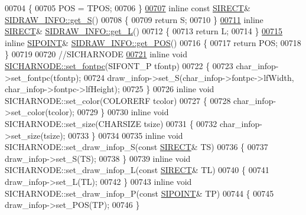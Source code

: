 \begin{DoxyCode}
00704 \{
00705     POS = TPOS;
00706 \}
\hyperlink{class_s_i_d_r_a_w___i_n_f_o_abb39527ef4c718afe5c78692fc24f12c}{00707} \textcolor{keyword}{inline} \textcolor{keyword}{const} \hyperlink{struct_s_i_r_e_c_t}{SIRECT}& \hyperlink{class_s_i_d_r_a_w___i_n_f_o_abb39527ef4c718afe5c78692fc24f12c}{SIDRAW\_INFO::get\_S}()
00708 \{
00709     \textcolor{keywordflow}{return} S;
00710 \}
\hyperlink{class_s_i_d_r_a_w___i_n_f_o_abb4f53a14df75b907572d7d95c275b1d}{00711} \textcolor{keyword}{inline} \hyperlink{struct_s_i_r_e_c_t}{SIRECT}& \hyperlink{class_s_i_d_r_a_w___i_n_f_o_abb4f53a14df75b907572d7d95c275b1d}{SIDRAW\_INFO::get\_L}()
00712 \{
00713     \textcolor{keywordflow}{return} L;
00714 \}
\hyperlink{class_s_i_d_r_a_w___i_n_f_o_aeca1707cc1e7e849f7e4e14f8ea36503}{00715} \textcolor{keyword}{inline} \hyperlink{struct_s_i_p_o_i_n_t}{SIPOINT}& \hyperlink{class_s_i_d_r_a_w___i_n_f_o_aeca1707cc1e7e849f7e4e14f8ea36503}{SIDRAW\_INFO::get\_POS}()
00716 \{
00717     \textcolor{keywordflow}{return} POS;
00718 \}
00719 
00720 \textcolor{comment}{//SICHARNODE}
\hyperlink{class_s_i_c_h_a_r_n_o_d_e_aad179bc8f8fc9a4789e0b9ba06ecef9a}{00721} \textcolor{keyword}{inline} \textcolor{keywordtype}{void} \hyperlink{class_s_i_c_h_a_r_n_o_d_e_aad179bc8f8fc9a4789e0b9ba06ecef9a}{SICHARNODE::set\_fontpc}(SIFONT\_P tfontp)
00722 \{
00723     char\_infop->set\_fontpc(tfontp);
00724     draw\_infop->set\_S(char\_infop->fontpc->lfWidth, char\_infop->fontpc->lfHeight);
00725 \}
00726 \textcolor{keyword}{inline} \textcolor{keywordtype}{void} SICHARNODE::set\_color(COLORERF tcolor)
00727 \{
00728     char\_infop->set\_color(tcolor);
00729 \}
00730 \textcolor{keyword}{inline} \textcolor{keywordtype}{void} SICHARNODE::set\_size(CHARSIZE tsize)
00731 \{
00732     char\_infop->set\_size(tsize);
00733 \}
00734 
00735 \textcolor{keyword}{inline} \textcolor{keywordtype}{void} SICHARNODE::set\_draw\_infop\_S(\textcolor{keyword}{const} \hyperlink{struct_s_i_r_e_c_t}{SIRECT}& TS)
00736 \{
00737     draw\_infop->set\_S(TS);
00738 \}
00739 \textcolor{keyword}{inline} \textcolor{keywordtype}{void} SICHARNODE::set\_draw\_infop\_L(\textcolor{keyword}{const} \hyperlink{struct_s_i_r_e_c_t}{SIRECT}& TL)
00740 \{
00741     draw\_infop->set\_L(TL);
00742 \}
00743 \textcolor{keyword}{inline} \textcolor{keywordtype}{void} SICHARNODE::set\_draw\_infop\_P(\textcolor{keyword}{const} \hyperlink{struct_s_i_p_o_i_n_t}{SIPOINT}& TP)
00744 \{
00745     draw\_infop->set\_POS(TP);
00746 \}

\end{DoxyCode}
